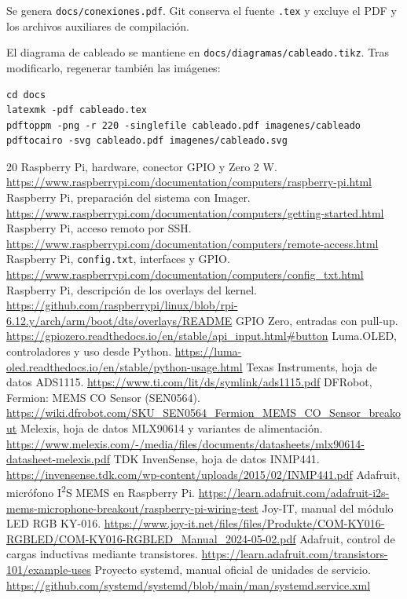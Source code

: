 \documentclass[11pt,a4paper]{article}
\newcommand{\iis}{I\textsuperscript{2}S}
\begin{document}
Se genera \texttt{docs/conexiones.pdf}. Git conserva el fuente \texttt{.tex}
y excluye el PDF y los archivos auxiliares de compilación.

El diagrama de cableado se mantiene en \texttt{docs/diagramas/cableado.tikz}.
Tras modificarlo, regenerar también las imágenes:

\begin{lstlisting}
cd docs
latexmk -pdf cableado.tex
pdftoppm -png -r 220 -singlefile cableado.pdf imagenes/cableado
pdftocairo -svg cableado.pdf imagenes/cableado.svg
\end{lstlisting}

\begin{thebibliography}{20}
\small
{} Raspberry Pi, hardware, conector GPIO y Zero 2 W.
\url{https://www.raspberrypi.com/documentation/computers/raspberry-pi.html}
 Raspberry Pi, preparación del sistema con Imager.
\url{https://www.raspberrypi.com/documentation/computers/getting-started.html}
 Raspberry Pi, acceso remoto por SSH.
\url{https://www.raspberrypi.com/documentation/computers/remote-access.html}
 Raspberry Pi, \texttt{config.txt}, interfaces y GPIO.
\url{https://www.raspberrypi.com/documentation/computers/config_txt.html}
 Raspberry Pi, descripción de los overlays del kernel.
\url{https://github.com/raspberrypi/linux/blob/rpi-6.12.y/arch/arm/boot/dts/overlays/README}
 GPIO Zero, entradas con pull-up.
\url{https://gpiozero.readthedocs.io/en/stable/api_input.html#button}
 Luma.OLED, controladores y uso desde Python.
\url{https://luma-oled.readthedocs.io/en/stable/python-usage.html}
 Texas Instruments, hoja de datos ADS1115.
\url{https://www.ti.com/lit/ds/symlink/ads1115.pdf}
 DFRobot, Fermion: MEMS CO Sensor (SEN0564).
\url{https://wiki.dfrobot.com/SKU_SEN0564_Fermion_MEMS_CO_Sensor_breakout}
 Melexis, hoja de datos MLX90614 y variantes de alimentación.
\url{https://www.melexis.com/-/media/files/documents/datasheets/mlx90614-datasheet-melexis.pdf}
 TDK InvenSense, hoja de datos INMP441.
\url{https://invensense.tdk.com/wp-content/uploads/2015/02/INMP441.pdf}
 Adafruit, micrófono \iis{} MEMS en Raspberry Pi.
\url{https://learn.adafruit.com/adafruit-i2s-mems-microphone-breakout/raspberry-pi-wiring-test}
 Joy-IT, manual del módulo LED RGB KY-016.
\url{https://www.joy-it.net/files/files/Produkte/COM-KY016-RGBLED/COM-KY016-RGBLED_Manual_2024-05-02.pdf}
 Adafruit, control de cargas inductivas mediante transistores.
\url{https://learn.adafruit.com/transistors-101/example-uses}
 Proyecto systemd, manual oficial de unidades de servicio.
\url{https://github.com/systemd/systemd/blob/main/man/systemd.service.xml}
\end{thebibliography}
\end{document}
